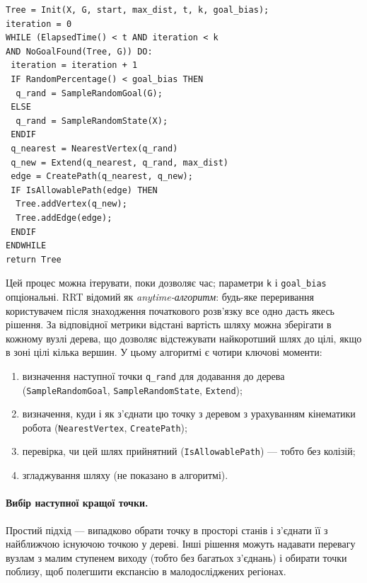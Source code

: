 \begin{center}
\begin{minipage}{0.8\linewidth}
\begin{verbatim}
Tree = Init(X, G, start, max_dist, t, k, goal_bias);
iteration = 0
WHILE (ElapsedTime() < t AND iteration < k
AND NoGoalFound(Tree, G)) DO:
 iteration = iteration + 1
 IF RandomPercentage() < goal_bias THEN
  q_rand = SampleRandomGoal(G);
 ELSE
  q_rand = SampleRandomState(X);
 ENDIF
 q_nearest = NearestVertex(q_rand)
 q_new = Extend(q_nearest, q_rand, max_dist)
 edge = CreatePath(q_nearest, q_new);
 IF IsAllowablePath(edge) THEN
  Tree.addVertex(q_new);
  Tree.addEdge(edge);
 ENDIF
ENDWHILE
return Tree
\end{verbatim}
\end{minipage}
\end{center}

Цей процес можна ітерувати, поки дозволяє час; параметри \texttt{k} і \texttt{goal\_bias} опціональні. RRT відомий як \emph{anytime-алгоритм}: будь-яке переривання користувачем після знаходження початкового розв'язку все одно дасть якесь рішення. За відповідної метрики відстані вартість шляху можна зберігати в кожному вузлі дерева, що дозволяє відстежувати найкоротший шлях до цілі, якщо в зоні цілі кілька вершин.
У цьому алгоритмі є чотири ключові моменти:

\begin{enumerate}
    \item визначення наступної точки \texttt{q\_rand} для додавання до дерева (\texttt{SampleRandomGoal}, \texttt{SampleRandomState}, \texttt{Extend});
    \item визначення, куди і як з'єднати цю точку з деревом з урахуванням кінематики робота (\texttt{NearestVertex}, \texttt{CreatePath});
    \item перевірка, чи цей шлях прийнятний (\texttt{IsAllowablePath}) — тобто без колізій;
    \item згладжування шляху (не показано в алгоритмі).
\end{enumerate}

\paragraph{Вибір наступної кращої точки.}
Простий підхід — випадково обрати точку в просторі станів і з'єднати її з найближчою існуючою точкою у дереві.
Інші рішення можуть надавати перевагу вузлам з малим ступенем виходу (тобто без багатьох з'єднань) і обирати точки поблизу, щоб полегшити експансію в малодосліджених регіонах.

